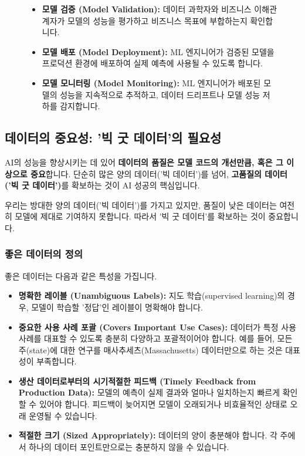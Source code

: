 \documentclass[11pt,a4paper]{article}
\theoremstyle{definition}
\begin{document}
\begin{figure}[h!]
\begin{itemize}
        \item \textbf{모델 검증 (Model Validation):} 데이터 과학자와 비즈니스 이해관계자가 모델의 성능을 평가하고 비즈니스 목표에 부합하는지 확인합니다.
        \item \textbf{모델 배포 (Model Deployment):} ML 엔지니어가 검증된 모델을 프로덕션 환경에 배포하여 실제 예측에 사용될 수 있도록 합니다.
        \item \textbf{모델 모니터링 (Model Monitoring):} ML 엔지니어가 배포된 모델의 성능을 지속적으로 추적하고, 데이터 드리프트나 모델 성능 저하를 감지합니다.
    \end{itemize}
\end{figure}

\subsection{데이터의 중요성: '빅 굿 데이터'의 필요성}

\begin{summarybox}
AI의 성능을 향상시키는 데 있어 \textbf{데이터의 품질은 모델 코드의 개선만큼, 혹은 그 이상으로 중요}합니다. 단순히 많은 양의 데이터('빅 데이터')를 넘어, \textbf{고품질의 데이터('빅 굿 데이터')}를 확보하는 것이 AI 성공의 핵심입니다.
\end{summarybox}

우리는 방대한 양의 데이터('빅 데이터')를 가지고 있지만, 품질이 낮은 데이터는 여전히 모델에 제대로 기여하지 못합니다. 따라서 '빅 굿 데이터'를 확보하는 것이 중요합니다.

\subsubsection{좋은 데이터의 정의}
좋은 데이터는 다음과 같은 특성을 가집니다.
\begin{itemize}
    \item \textbf{명확한 레이블 (Unambiguous Labels):} 지도 학습(supervised learning)의 경우, 모델이 학습할 '정답'인 레이블이 명확해야 합니다.
    \item \textbf{중요한 사용 사례 포괄 (Covers Important Use Cases):} 데이터가 특정 사용 사례를 대표할 수 있도록 충분히 다양하고 포괄적이어야 합니다. 예를 들어, 모든 주(state)에 대한 연구를 매사추세츠(Massachusetts) 데이터만으로 하는 것은 대표성이 부족합니다.
    \item \textbf{생산 데이터로부터의 시기적절한 피드백 (Timely Feedback from Production Data):} 모델의 예측이 실제 결과와 얼마나 일치하는지 빠르게 확인할 수 있어야 합니다. 피드백이 늦어지면 모델이 오래되거나 비효율적인 상태로 오래 운영될 수 있습니다.
    \item \textbf{적절한 크기 (Sized Appropriately):} 데이터의 양이 충분해야 합니다. 각 주에서 하나의 데이터 포인트만으로는 충분하지 않을 수 있습니다.
\end{itemize}
\end{document}
